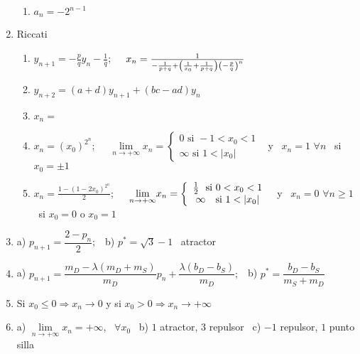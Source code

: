 \documentclass{article}
\begin{document}
\begin{enumerate}
\begin{enumerate}
\item $a_{n}=-2^{n-1}$
\end{enumerate}

\item Riccati

\begin{enumerate}
\item $y_{n+1}=-\frac{p}{q}y_{n}-\frac{1}{q};$ \ \ $x_{n}=\frac{1}{-\frac{1}{%
p+q}+\left( \frac{1}{x_{0}}+\frac{1}{p+q}\right) \left( -\frac{p}{q}\right)
^{n}}$

\item $y_{n+2}=\left( a+d\right) y_{n+1}+\left( bc-ad\right) y_{n}$

\item $x_{n}=$

\item $x_{n}=\left( x_{0}\right) ^{2^{n}};$ \ \ $\underset{n\rightarrow
+\infty }{\lim }x_{n}=\left\{ 
\begin{array}{c}
0\text{ \ si }-1<x_{0}<1 \\ 
\infty \text{ \ \ si }1<\left\vert x_{0}\right\vert%
\end{array}%
\right. $ \ y \ $x_{n}=1$ $\forall n$ \ si $x_{0}=\pm 1$

\item $x_{n}=\frac{1-\left( 1-2x_{0}\right) ^{2^{n}}}{2};$ \ \ $\underset{%
n\rightarrow +\infty }{\lim }x_{n}=\left\{ 
\begin{array}{c}
\frac{1}{2}\text{ \ si }0<x_{0}<1 \\ 
\infty \text{ \ \ si }1<\left\vert x_{0}\right\vert%
\end{array}%
\right. $ \ y \ $x_{n}=0$ $\forall n\geq 1$ \ si $x_{0}=0$ o $x_{0}=1$
\end{enumerate}

\item a) $p_{n+1}=\dfrac{2-p_{n}}{2};$ \ b) $p^{\ast }=\sqrt{3}-1$ \ atractor

\item a) $p_{n+1}=\dfrac{m_{D}-\lambda \left( m_{D}+m_{S}\right) }{m_{D}}%
p_{n}+\dfrac{\lambda \left( b_{D}-b_{S}\right) }{m_{D}};$ \ b) $p^{\ast }=%
\dfrac{b_{D}-b_{S}}{m_{S}+m_{D}}$

\item Si $x_{0}\leq 0\Rightarrow x_{n}\rightarrow 0$ y si $%
x_{0}>0\Rightarrow x_{n}\rightarrow +\infty $

\item a) $\underset{n\rightarrow +\infty }{\lim }x_{n}=+\infty $, \ $\forall
x_{0}$ \ b) $1$ atractor, $3$ repulsor \ c) $-1$ repulsor, $1$ punto silla


\end{enumerate}
\end{document}
